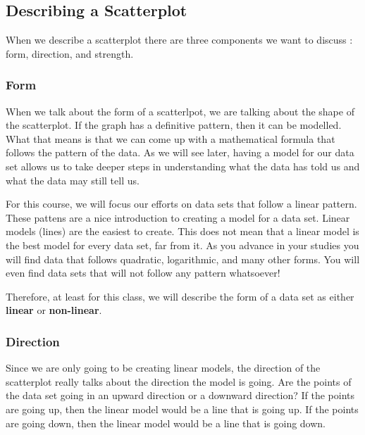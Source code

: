 \documentclass[
  letterpaper,
  DIV=11,
  numbers=noendperiod]{scrreprt}
\begin{document}
\subsection*{Describing a Scatterplot}\label{describing-a-scatterplot}

When we describe a scatterplot there are three components we want to
discuss : form, direction, and strength.

\subsubsection*{Form}\label{form}

When we talk about the form of a scatterlpot, we are talking about the
shape of the scatterplot. If the graph has a definitive pattern, then it
can be modelled. What that means is that we can come up with a
mathematical formula that follows the pattern of the data. As we will
see later, having a model for our data set allows us to take deeper
steps in understanding what the data has told us and what the data may
still tell us.

For this course, we will focus our efforts on data sets that follow a
linear pattern. These pattens are a nice introduction to creating a
model for a data set. Linear models (lines) are the easiest to create.
This does not mean that a linear model is the best model for every data
set, far from it. As you advance in your studies you will find data that
follows quadratic, logarithmic, and many other forms. You will even find
data sets that will not follow any pattern whatsoever!

Therefore, at least for this class, we will describe the form of a data
set as either \textbf{linear} or \textbf{non-linear}.

\subsubsection*{Direction}\label{direction}

Since we are only going to be creating linear models, the direction of
the scatterplot really talks about the direction the model is going. Are
the points of the data set going in an upward direction or a downward
direction? If the points are going up, then the linear model would be a
line that is going up. If the points are going down, then the linear
model would be a line that is going down.
\end{document}
